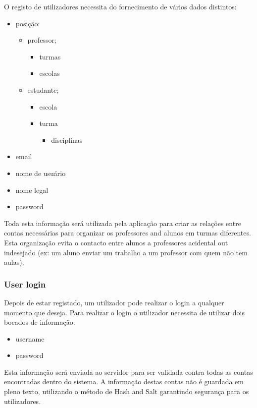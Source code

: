 \documentclass[10pt]{article}
\begin{document}
O registo de utilizadores necessita do fornecimento de vários dados distintos:
\begin{itemize}
    \item posição:
        \begin{itemize}
            \item professor;
                \begin{itemize}
                    \item turmas
                    \item escolas
                \end{itemize}
            \item estudante;
                \begin{itemize}
                    \item escola
                    \item turma
                        \begin{itemize}
                            \item disciplinas
                        \end{itemize}
                \end{itemize}
        \end{itemize}
    \item email
    \item nome de usuário
    \item nome legal
    \item password
\end{itemize}

Toda esta informação será utilizada pela aplicação para criar as relações
entre contas necessárias para organizar os professores and alunos em turmas
diferentes. Esta organização evita o contacto entre alunos a professores acidental
out indesejado (ex: um aluno enviar um trabalho a um professor com quem não tem aulas).

\newpage

\subsubsection{User login}
Depois de estar registado, um utilizador pode realizar o login a qualquer momento que deseja.
Para realizar o login o utilizador necessita de utilizar dois bocados de informação:
\begin{itemize}
    \item username
    \item password
\end{itemize}
Esta informação será enviada ao servidor para ser validada contra todas as contas encontradas
dentro do sistema. A informação destas contas não é guardada em pleno texto, utilizando
o método de Hash and Salt garantindo segurança para os utilizadores.
\end{document}
